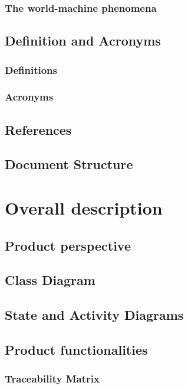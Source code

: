 \documentclass[12pt]{article}
\begin{document}
	\subsubsection{The world-machine phenomena}
	
	\clearpage
	\subsection{Definition and Acronyms}
	\subsubsection{Definitions}
	
	\subsubsection{Acronyms}
	
	\subsection{References}
	
	\subsection{Document Structure}
	
	\clearpage
	\section{Overall description}
	\subsection{Product perspective}
	
	\subsection{Class Diagram}
	
	\subsection{State and Activity Diagrams}
	
	\subsection{Product functionalities}
	
	\subsubsection{Traceability Matrix}
	
\end{document}
